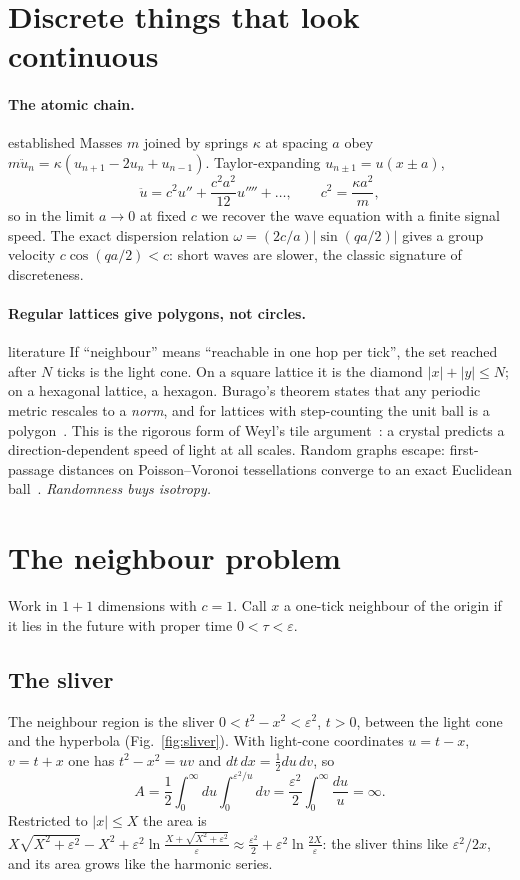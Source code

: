\documentclass[11pt,a4paper]{article}
\newcommand{\tagbox}[2]{\textsf{\scriptsize\colorbox{#1!12}{\textcolor{#1!70!black}{#2}}}}
\newcommand{\est}{\tagbox{gray}{established}}
\newcommand{\lit}{\tagbox{blue}{literature}}
\begin{document}
\section{Discrete things that look continuous}
\paragraph{The atomic chain.} \est{} Masses $m$ joined by springs $\kappa$ at spacing $a$ obey $m\ddot u_n=\kappa(u_{n+1}-2u_n+u_{n-1})$. Taylor-expanding $u_{n\pm1}=u(x\pm a)$,
\begin{equation}
\ddot u=c^2u''+\frac{c^2a^2}{12}u''''+\dots,\qquad c^2=\frac{\kappa a^2}{m},
\end{equation}
so in the limit $a\to0$ at fixed $c$ we recover the wave equation with a finite signal speed. The exact dispersion relation $\omega=(2c/a)|\sin(qa/2)|$ gives a group velocity $c\cos(qa/2)<c$: short waves are slower, the classic signature of discreteness.

\paragraph{Regular lattices give polygons, not circles.} \lit{} If ``neighbour'' means ``reachable in one hop per tick'', the set reached after $N$ ticks is the light cone. On a square lattice it is the diamond $|x|+|y|\le N$; on a hexagonal lattice, a hexagon. Burago's theorem states that any periodic metric rescales to a \emph{norm}, and for lattices with step-counting the unit ball is a polygon~\cite{Burago}. This is the rigorous form of Weyl's tile argument~\cite{Weyl}: a crystal predicts a direction-dependent speed of light at all scales. Random graphs escape: first-passage distances on Poisson--Voronoi tessellations converge to an exact Euclidean ball~\cite{VahidiAslWierman}. \emph{Randomness buys isotropy.}

\section{The neighbour problem}
Work in $1+1$ dimensions with $c=1$. Call $x$ a one-tick neighbour of the origin if it lies in the future with proper time $0<\tau<\varepsilon$.

\subsection{The sliver}
The neighbour region is the sliver $0<t^2-x^2<\varepsilon^2$, $t>0$, between the light cone and the hyperbola (Fig.~\ref{fig:sliver}). With light-cone coordinates $u=t-x$, $v=t+x$ one has $t^2-x^2=uv$ and $dt\,dx=\tfrac12du\,dv$, so
\begin{equation}
A=\frac12\int_0^\infty du\int_0^{\varepsilon^2/u}dv=\frac{\varepsilon^2}{2}\int_0^\infty\frac{du}{u}=\infty .
\end{equation}
Restricted to $|x|\le X$ the area is $X\sqrt{X^2+\varepsilon^2}-X^2+\varepsilon^2\ln\frac{X+\sqrt{X^2+\varepsilon^2}}{\varepsilon}\approx \tfrac{\varepsilon^2}{2}+\varepsilon^2\ln\frac{2X}{\varepsilon}$: the sliver thins like $\varepsilon^2/2x$, and its area grows like the harmonic series.
\end{document}
